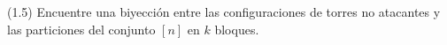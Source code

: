 (1.5) Encuentre una biyección entre las configuraciones de torres no atacantes y las particiones del conjunto \([n]\) en \(k\) bloques.